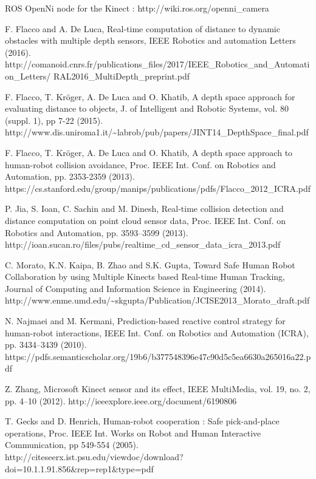\documentclass[smallextended]{svjour3}
\begin{document}
\begin{thebibliography}{}

ROS OpenNi node for the Kinect :
http://wiki.ros.org/openni\_camera

F. Flacco and A. De Luca, Real-time computation of distance to dynamic obstacles with multiple depth sensors, IEEE Robotics and automation Letters (2016).
http://comanoid.cnrs.fr/publications\_files/2017/IEEE\_Robotics\_and\_Automation\_Letters/
RAL2016\_MultiDepth\_preprint.pdf

F. Flacco, T. Kröger, A. De Luca and O. Khatib, A depth space approach for evaluating distance to objects, J. of Intelligent and Robotic Systems, vol. 80 (suppl. 1), pp 7-22 (2015).
http://www.dis.uniroma1.it/\textasciitilde labrob/pub/papers/JINT14\_DepthSpace\_final.pdf

F. Flacco, T. Kröger, A. De Luca and O. Khatib, A depth space approach to human-robot collision avoidance, Proc. IEEE Int. Conf. on Robotics and Automation, pp. 2353-2359 (2013).
https://cs.stanford.edu/group/manips/publications/pdfs/Flacco\_2012\_ICRA.pdf


P. Jia, S. Ioan, C. Sachin and M. Dinesh, Real-time collision detection and  distance computation  on  point  cloud  sensor data, Proc.  IEEE Int. Conf. on Robotics and Automation, pp. 3593–3599 (2013).
http://ioan.sucan.ro/files/pubs/realtime\_cd\_sensor\_data\_icra\_2013.pdf

C. Morato, K.N. Kaipa, B. Zhao and S.K. Gupta, Toward Safe Human Robot Collaboration by using Multiple Kinects based Real-time Human Tracking, Journal of Computing and Information Science in Engineering (2014).
http://www.enme.umd.edu/\textasciitilde skgupta/Publication/JCISE2013\_Morato\_draft.pdf

N. Najmaei and M. Kermani, Prediction-based reactive control strategy for human-robot interactions, IEEE Int. Conf. on Robotics and Automation (ICRA), pp. 3434–3439 (2010).
https://pdfs.semanticscholar.org/19b6/b377548396e47c90d5c5ea6630a265016a22.pdf

Z. Zhang, Microsoft Kinect sensor and its effect, IEEE MultiMedia, vol. 19, no. 2, pp. 4–10 (2012).
http://ieeexplore.ieee.org/document/6190806

T. Gecks and D. Henrich, Human-robot cooperation : Safe pick-and-place operations, Proc. IEEE Int. Works on Robot and Human Interactive Communication, pp 549-554 (2005).
http://citeseerx.ist.psu.edu/viewdoc/download?doi=10.1.1.91.856\&rep=rep1\&type=pdf

\end{thebibliography}
\end{document}
